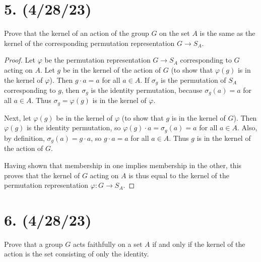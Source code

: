 \documentclass{article}
\begin{document}
\section*{5. (4/28/23)}

Prove that the kernel of an action of the group $G$ on the set $A$ is the same as the kernel of the corresponding permutation representation $G \rightarrow S_A$.

\begin{proof}
    Let $\varphi$ be the permutation representation $G \rightarrow S_A$ corresponding to $G$ acting on $A$. Let $g$ be in the kernel of the action of $G$ (to show that $\varphi(g)$ is in the kernel of $\varphi$). Then $g \cdot a = a$ for all $a \in A$. If $\sigma_g$ is the permutation of $S_A$ corresponding to $g$, then $\sigma_g$ is the identity permutation, because $\sigma_g(a) = a$ for all $a \in A$. Thus $\sigma_g = \varphi(g)$ is in the kernel of $\varphi$.

    Next, let $\varphi(g)$ be in the kernel of $\varphi$ (to show that $g$ is in the kernel of $G$). Then $\varphi(g)$ is the identity permutation, so $\varphi(g) \cdot a = \sigma_g(a) = a$ for all $a \in A$. Also, by definition, $\sigma_g(a) = g \cdot a$, so $g \cdot a = a$ for all $a \in A$. Thus $g$ is in the kernel of the action of $G$.

    Having shown that membership in one implies membership in the other, this proves that the kernel of $G$ acting on $A$ is thus equal to the kernel of the permutation representation $\varphi: G \rightarrow S_A$.
\end{proof}

\section*{6. (4/28/23)}

Prove that a group $G$ acts faithfully on a set $A$ if and only if the kernel of the action is the set consisting of only the identity.
\end{document}

